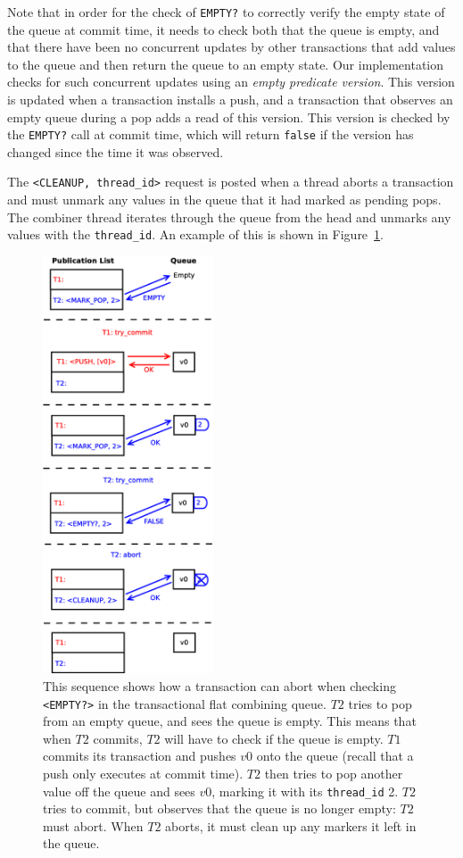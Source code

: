 Note that in order for the check of \texttt{EMPTY?} to correctly verify the empty state of the queue at commit time, it needs to check both that the queue is empty, and that there have been no concurrent updates by other transactions that add values to the queue and then return the queue to an empty state. Our implementation checks for such concurrent updates using an \emph{empty predicate version}. This version is updated when a transaction installs a push, and a transaction that observes an empty queue during a pop adds a read of this version. This version is checked by the \texttt{EMPTY?} call at commit time, which will return \texttt{false} if the version has changed since the time it was observed.

The \texttt{<CLEANUP, thread\_id>} request is posted when a thread aborts a transaction and must unmark any values in the queue that it had marked as pending pops. The combiner thread iterates through the queue from the head and unmarks any values with the \texttt{thread\_id}. An example of this is shown in Figure~\ref{fig:fcqueue_abort2}.

\begin{figure}[H]
\centering
\includegraphics[width=0.45\textwidth]{fcqueue_abort2}
    \caption[Abort and cleanup when checking the empty status of the queue]{This sequence shows how a transaction can abort when checking \texttt{<EMPTY?>} in the transactional flat combining queue. $T2$ tries to pop from an empty queue, and sees the queue is empty. This means that when $T2$ commits, $T2$ will have to check if the queue is empty. $T1$ commits its transaction and pushes $v0$ onto the queue (recall that a push only executes at commit time). $T2$ then tries to pop another value off the queue and sees $v0$, marking it with its \texttt{thread\_id} 2. $T2$ tries to commit, but observes that the queue is no longer empty: $T2$ must abort. When $T2$ aborts, it must clean up any markers it left in the queue.}
\label{fig:fcqueue_abort2}
\end{figure}
